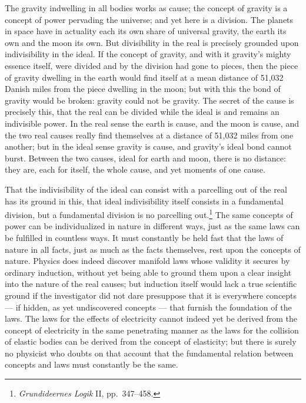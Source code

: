 \documentclass[12pt,a4paper]{book}
\begin{document}
The gravity indwelling in all bodies works as cause; the concept of gravity is a concept of power
pervading the universe; and yet here is a division. The planets in space have in actuality each
its own share of universal gravity, the earth its own and the moon its own. But divisibility in
the real is precisely grounded upon indivisibility in the ideal. If the concept of gravity, and
with it gravity's mighty essence itself, were divided and by the division had gone to pieces,
then the piece of gravity dwelling in the earth would find itself at a mean distance of 51,032
Danish miles from the piece dwelling in the moon; but with this the bond of gravity would be
broken: gravity could not be gravity. The secret of the cause is precisely this, that the real
can be divided while the ideal is and remains an indivisible power. In the real sense the earth
is cause, and the moon is cause, and the two
real causes really find themselves at a distance of 51,032 miles from one another; but in the
ideal sense gravity is cause, and gravity's ideal bond cannot burst. Between the two causes,
ideal for earth and moon, there is no distance: they are, each for itself, the whole cause, and
yet moments of one cause.

That the indivisibility of the ideal can consist with a parcelling out of the real has its ground
in this, that ideal indivisibility itself consists in a fundamental division, but a fundamental
division is no parcelling out.\footnote{%
\textit{Grundideernes Logik} II, pp.\ 347--458.} The same concepts of power can be individualized
in nature in different ways, just as the same laws can be fulfilled in countless ways. It must
constantly be held fast that the laws of nature in all facts, just as much as the facts
themselves, rest upon the concepts of nature. Physics does indeed discover manifold laws whose
validity it secures by ordinary induction, without yet being able to ground them upon a clear
insight into the nature of the real causes; but induction itself would lack a true scientific
ground if the investigator did not dare presuppose that it is everywhere concepts --- if hidden,
as yet undiscovered concepts --- that furnish the foundation of the laws. The laws for the
effects of electricity cannot indeed yet be derived from the concept of electricity in the same
penetrating manner as the laws for the collision of elastic bodies can be derived from the
concept of elasticity; but there is surely no physicist who doubts on that account that the
fundamental relation between concepts and laws must constantly be the same.
\end{document}

